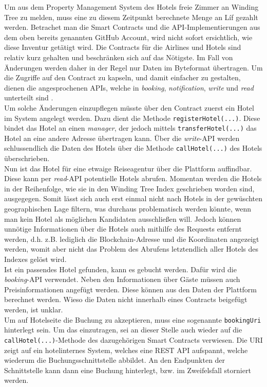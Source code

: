 Um aus dem Property Management System des Hotels freie Zimmer an Winding Tree zu melden, muss eine zu diesem Zeitpunkt berechnete Menge an Líf gezahlt werden. Betrachet man die Smart Contracts und die API-Implementierungen aus dem oben bereits genannten GitHub Account, wird nicht sofort ersichtlich, wie diese Inventur getätigt wird. Die Contracts für die Airlines und Hotels sind relativ kurz gehalten und beschränken sich auf das Nötigste. Im Fall von Änderungen werden daher in der Regel nur Daten im Byteformat übertragen. Um die Zugriffe auf den Contract zu kapseln, und damit einfacher zu gestalten, dienen die angesprochenen APIs, welche in \emph{booking}, \emph{notification}, \emph{write} und \emph{read} unterteilt sind \cite[vgl.][]{WTAPIOverview2019}.\\
Um solche Änderungen einzupflegen müsste über den Contract zuerst ein Hotel im System angelegt werden. Dazu dient die Methode \texttt{registerHotel(...)}. Diese bindet das Hotel an einen \emph{manager}, der jedoch mittels \texttt{transferHotel(...)} das Hotel an eine andere Adresse übertragen kann. Über die \emph{write}-API werden schlussendlich die Daten des Hotels über die Methode \texttt{callHotel(...)} des Hotels überschrieben. \cite[vgl.][]{WTHotelContract2019, WTInventory2019}\\
Nun ist das Hotel für eine etwaige Reiseagentur über die Plattform auffindbar. Diese kann per \emph{read}-API potentielle Hotels abrufen. Momentan werden die Hotels in der Reihenfolge, wie sie in den Winding Tree Index geschrieben worden sind, ausgegegen. Somit lässt sich auch erst einmal nicht nach Hotels in der gewüschten geographischen Lage filtern, was durchaus problematisch werden könnte, wenn man kein Hotel als möglichen Kandidaten ausschließen will. Jedoch können unnötige Informationen über die Hotels auch mithilfe des Requests entfernt werden, d.h. z.B. lediglich die Blockchain-Adresse und die Koordinaten angezeigt werden, womit aber nicht das Problem des Abrufens letztendlich aller Hotels des Indexes gelöst wird. \cite[vgl.][]{WTQueryInventory2019}\\
Ist ein passendes Hotel gefunden, kann es gebucht werden. Dafür wird die \emph{booking}-API verwendet. Neben den Informationen über Gäste müssen auch Preisinformationen angefügt werden. Diese können aus den Daten der Plattform berechnet werden. Wieso die Daten nicht innerhalb eines Contracts beigefügt werden, ist unklar. \cite[vgl.][]{WTBooking2019}\\
Um auf Hotelseite die Buchung zu akzeptieren, muss eine sogenannte \texttt{bookingUri} hinterlegt sein. Um das einzutragen, sei an dieser Stelle auch wieder auf die \texttt{callHotel(...)}-Methode des dazugehörigen Smart Contracts verwiesen. Die URI zeigt auf ein hotelinternes System, welches eine REST API aufspannt, welche wiederum die Buchungsschnittstelle abbildet. An den Endpunkten der Schnittstelle kann dann eine Buchung hinterlegt, bzw. im Zweifelsfall storniert werden. \cite[vgl.][]{WTBookingAccept2019}

